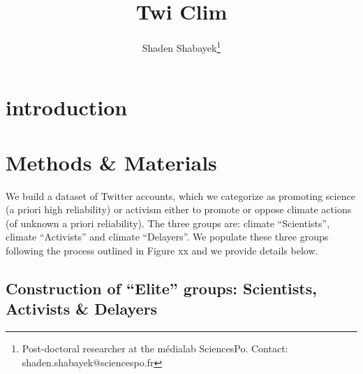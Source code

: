 \documentclass{article}
\begin{document}
\title{Twi Clim}
\author{Shaden Shabayek\footnote{Post-doctoral researcher at the m\'{e}dialab SciencesPo. Contact: shaden.shabayek@sciencespo.fr}}
\maketitle{}

\onehalfspace

\section{introduction}

\section{Methods \& Materials}

We build a dataset of Twitter accounts, which we categorize as promoting science (a priori high reliability) or activism either to promote or oppose climate actions (of unknown a priori reliability). The three groups are: climate “Scientists”, climate “Activists” and climate “Delayers”. We populate these three groups following the process outlined in Figure xx and we provide details below.  

\subsection{Construction of “Elite” groups: Scientists, Activists \& Delayers}
\end{document}
